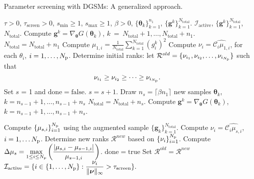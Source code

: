 \bigskip
\begin{breakablealgorithm}
\renewcommand{\algorithmicrequire}{\textbf{Input:}}
\renewcommand{\algorithmicensure}{\textbf{Output:}}
  \caption{Parameter screening with DGSMs: A generalized approach.}
  \begin{algorithmic}[1]
\Require $\tau > 0$, $\tau_\text{screen} > 0$, $s_\text{min} \geq 1$,
$s_\text{max} \geq 1$, $\beta > 0$, $\{ \bm{\theta}_k \}_{k = 1}^{n_1}$, $\{ \bm{g}^k \}_{k=1}^{N_\text{total}}$. 
\Ensure $\mathcal{I}_\text{active}$, $\{ \bm{g}^k \}_{k=1}^{N_\text{total}}$, $N_\text{total}$. 
      \State Compute $\bm{g}^k = \nabla_{\bm{\theta}}G(\bm\theta_k)$, 
             $k~=~N_\text{total}+1, \ldots, N_\text{total}+n_1$. 
      \State $N_\text{total} = N_\text{total} + n_1$
      \State Compute 
      $\mu_{1, i} = \frac{1}{N_\text{total}} \sum_{k = 1}^{N_\text{total}} (g^k_i)^2$
      \State Compute $\nu_i = \widehat{\mathcal{C}_i\mu_{1,i}}$, for each $\theta_i$, 
             $i = 1, \ldots, {N_\text{p}}$. 
      \State Determine initial ranks: 
            let $\mathcal{R}^{old} = \{ \nu_{i_1}, \nu_{i_2}, \ldots, \nu_{i_{N_\text{p}}}\}$ such that 
\[
   \nu_{i_1} \geq \nu_{i_2} \geq \cdots \geq \nu_{i_{N_\text{p}}}. 
\]
      \State Set $s$ = 1 and $\mathrm{done} = \mathrm{false}$.
        \State $s = s + 1$.
        \State Draw $n_s = \lceil \beta n_1 \rceil$ new samples 
                  $\bm{\theta}_k$, $k = n_{s-1} + 1, \ldots, n_{s-1} + n_s$
       \State $N_\text{total} = N_\text{total} + n_s$.
        \State Compute $\bm{g}^k = \nabla_{\bm{\theta}}G(\bm\theta_k)$,
             $k = n_{s-1}+1, \ldots, n_{s-1}+n_s$.

        \State Compute $\{ \mu_{s,i} \}_{i=1}^{N_\text{p}}$ using the augmented sample 
               $\{\bm{g}_k \}_{k = 1}^{N_\text{total}}$.
        \State Compute $\nu_i = \widehat{\mathcal{C}_i\mu_{s,i}}$, $i = 1, \ldots {N_\text{p}}$.
        \State Determine new ranks $\mathcal{R}^{new}$ based on $\{\nu_i\}_{i=1}^{N_\text{p}}$. 
        \State Compute $\displaystyle\Delta\mu_s = \max_{1\leq i \leq {N_\text{p}}}
               \left(\frac{|\mu_{s,i} - \mu_{s-1,i}|}{ \mu_{s-1,i}}\right)$.
         \State $\mathrm{done} = \mathrm{true}$
      \Else
          \State Set $\mathcal{R}^{old} = \mathcal{R}^{new}$
      \EndIf
    \EndWhile
    \State $\mathcal{I}_\text{active} = \{ i \in \{1, \ldots, {N_\text{p}}\} : \displaystyle\frac{\nu_i}
        {\|\bm{\nu}\|_\infty} > \tau_\text{screen}\}.$
    
    \EndProcedure
  \end{algorithmic}
  \label{alg:screen}
\end{breakablealgorithm}
\bigskip


